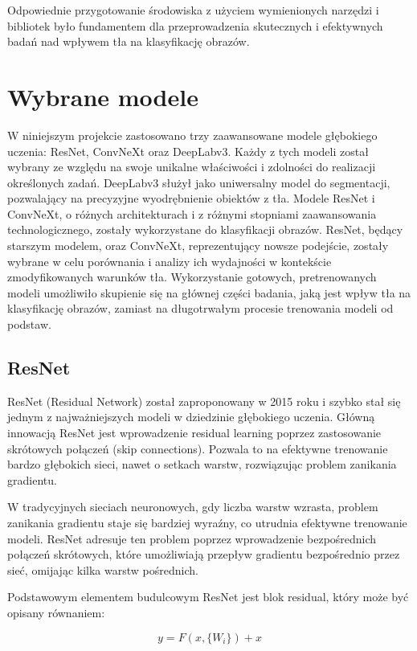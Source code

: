 Odpowiednie przygotowanie środowiska z użyciem wymienionych narzędzi i bibliotek było fundamentem dla 
przeprowadzenia skutecznych i efektywnych badań nad wpływem tła na klasyfikację obrazów.

\section*{Wybrane modele}

W niniejszym projekcie zastosowano trzy zaawansowane modele głębokiego uczenia: ResNet, ConvNeXt oraz DeepLabv3. 
Każdy z tych modeli został wybrany ze względu na swoje unikalne właściwości i zdolności do realizacji określonych zadań. 
DeepLabv3 służył jako uniwersalny model do segmentacji, pozwalający na precyzyjne wyodrębnienie obiektów z tła. 
Modele ResNet i ConvNeXt, o różnych architekturach i z różnymi stopniami zaawansowania technologicznego, zostały 
wykorzystane do klasyfikacji obrazów. ResNet, będący starszym modelem, oraz ConvNeXt, reprezentujący nowsze podejście, 
zostały wybrane w celu porównania i analizy ich wydajności w kontekście zmodyfikowanych warunków tła. Wykorzystanie 
gotowych, pretrenowanych modeli umożliwiło skupienie się na głównej części badania, jaką jest wpływ tła na klasyfikację 
obrazów, zamiast na długotrwałym procesie trenowania modeli od podstaw.

\subsection*{ResNet}

ResNet (Residual Network) został zaproponowany w 2015 roku i szybko stał się jednym z najważniejszych modeli w 
dziedzinie głębokiego uczenia. Główną innowacją ResNet jest wprowadzenie residual learning poprzez zastosowanie 
skrótowych połączeń (skip connections). Pozwala to na efektywne trenowanie bardzo głębokich sieci, nawet o setkach 
warstw, rozwiązując problem zanikania gradientu.

W tradycyjnych sieciach neuronowych, gdy liczba warstw wzrasta, problem zanikania gradientu staje się bardziej wyraźny, 
co utrudnia efektywne trenowanie modeli. ResNet adresuje ten problem poprzez wprowadzenie bezpośrednich połączeń 
skrótowych, które umożliwiają przepływ gradientu bezpośrednio przez sieć, omijając kilka warstw pośrednich.

Podstawowym elementem budulcowym ResNet jest blok residual, który może być opisany równaniem:

\begin{equation}
    y = F(x, \{W_i\}) + x
\end{equation}

